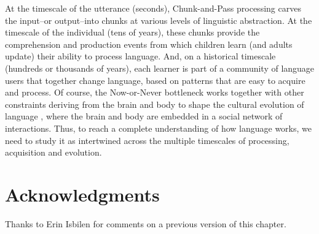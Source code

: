 \documentclass[output=paper]{langsci/langscibook}
\begin{document}
At the timescale of the utterance (seconds), Chunk-and-Pass processing carves the input--or output--into chunks at various levels of linguistic abstraction. At the timescale of the individual (tens of years), these chunks provide the comprehension and production events from which children learn (and adults update) their ability to process language. And, on a historical timescale (hundreds or thousands of years), each learner is part of a community of language users that together change language, based on patterns that are easy to acquire and process. Of course, the Now-or-Never bottleneck works together with other constraints deriving from the brain and body to shape the cultural evolution of language \citep{Christiansen2008,Christiansen2016}, where the brain and body are embedded in a social network of interactions. Thus, to reach a complete understanding of how language works, we need to study it as intertwined across the multiple timescales of processing, acquisition and evolution.
 

\section*{Acknowledgments}


Thanks to Erin Isbilen for comments on a previous version of this chapter.

{\sloppy
\printbibliography[heading=subbibliography,notkeyword=this]
}
\end{document}
